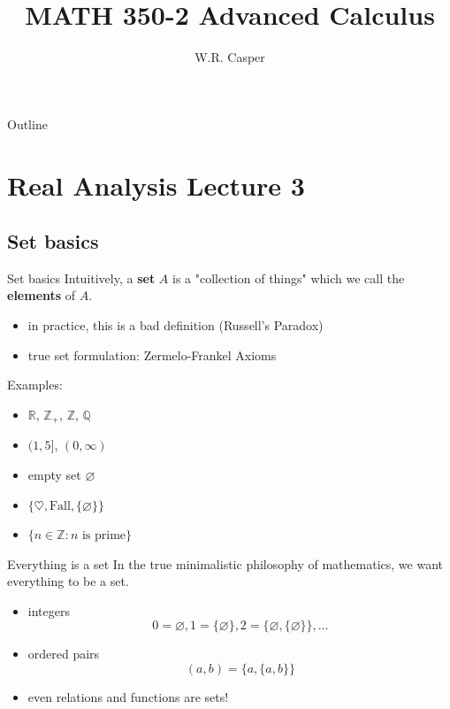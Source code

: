 \documentclass{beamer}
\title{MATH 350-2 Advanced Calculus}
\subtitle
{} %
\author[W.R. Casper] %
{W.R. Casper}
\institute[California State University Fullerton] %
{
  Department of Mathematics\\
  California State University Fullerton}
\begin{document}
\begin{frame}
  \titlepage
\end{frame}

\begin{frame}{Outline}
  \tableofcontents
\end{frame}



\section{Real Analysis Lecture 3}

\subsection{Set basics}

\begin{frame}{Set basics}
Intuitively, a \textbf{set} $A$ is a "collection of things" which we call the \textbf{elements} of $A$.
\begin{itemize}
\pause
\item in practice, this is a bad definition (Russell's Paradox)
\pause
\item true set formulation: Zermelo-Frankel Axioms
\end{itemize}
\pause
Examples:
\begin{itemize}
\pause
\item $\mathbb R$, $\mathbb{Z}_+$, $\mathbb{Z}$, $\mathbb{Q}$
\pause
\item $(1,5]$, $(0,\infty)$
\pause
\item empty set $\varnothing$
\pause
\item $\{\heartsuit,\text{Fall}, \{\varnothing\}\}$
\pause
\item $\{n\in \mathbb{Z}: \text{$n$ is prime}\}$
\end{itemize}
\end{frame}

\begin{frame}{Everything is a set}
In the true minimalistic philosophy of mathematics, we want everything to be a set.
\begin{itemize}
\pause
\item integers
\pause
$$0 = \varnothing, 1 = \{\varnothing\}, 2 = \{\varnothing,\{\varnothing\}\},\dots$$
\pause
\item ordered pairs
\pause
$$(a,b) = \{a,\{a,b\}\}$$
\pause
\item even relations and functions are sets!
\end{itemize}
\end{frame}
\end{document}
